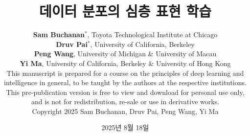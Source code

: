 \documentclass{book}
\begin{document}
\title{데이터 분포의 심층 표현 학습 \vspace{0.1in}\\
}

\author{\vspace{0.5cm}
\textbf{Sam Buchanan}$^*$, Toyota Technological Institute at Chicago \vspace{3mm}\\
    \textbf{Druv Pai}$^*$, University of California, Berkeley \vspace{3mm} \\
    \textbf{Peng Wang}, University of Michigan \&
    University of Macau  \vspace{3mm} \\
    \textbf{Yi Ma},   University of California, Berkeley \& University of Hong Kong
	\vspace{8cm}\\
	\footnotesize
	This manuscript is prepared for a course on the principles of deep learning
  and intelligence in general, to be taught by the authors at the respective
  institutions. This pre-publication version is free to view and download for
  personal use only, and is not for redistribution, re-sale or use in derivative
  works.\\  Copyright  2025 Sam Buchanan, Druv Pai, Peng Wang, Yi Ma
}

\date{\large 2025년 8월 18일}

\frontmatter
\titlepage
\thispagestyle{empty}
\maketitle

% 

% 


\cleardoublepage
\end{document}
